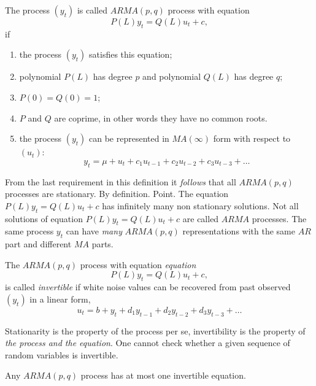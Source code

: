 \documentclass[12pt]{article} %
\begin{document}
\begin{definition}
    The process $(y_t)$ is called $ARMA(p, q)$ process with equation  
    \[
    P(L) y_t = Q(L) u_t + c,    
    \]
    if 
    \begin{enumerate}
        \item the process $(y_t)$ satisfies this equation;
        \item polynomial $P(L)$ has degree $p$ and polynomial $Q(L)$ has degree $q$;
        \item $P(0) = Q(0) = 1$;
        \item $P$ and $Q$ are coprime, in other words they have no common roots. 
        \item the process $(y_t)$ can be represented in $MA(\infty)$ form with respect to $(u_t)$:
        \[
            y_t = \mu + u_t + c_1 u_{t-1} + c_2 u_{t-2} + c_3 u_{t-3} + \ldots
        \]
    \end{enumerate}
\end{definition}


From the last requirement in this definition it \textit{follows} that all $ARMA(p,q)$ processes are 
stationary. By definition. Point. 
The equation $P(L) y_t = Q(L) u_t + c$ has infinitely many non stationary solutions. 
Not all solutions of equation $P(L) y_t = Q(L) u_t + c$ are called $ARMA$ processes. 
The same process $y_t$ can have \textit{many} $ARMA(p, q)$ representations with the same $AR$ part and 
different $MA$ parts. 



\begin{definition}
    The $ARMA(p, q)$ process with equation \textit{equation}
    \[
    P(L) y_t = Q(L) u_t + c,    
    \]
    is called \textit{invertible} if white noise values can be recovered from past observed $(y_t)$ in a linear form,
    \[
       u_t = b + y_t + d_1 y_{t-1} + d_2 y_{t-2} + d_3 y_{t-3} + \ldots      
    \]
\end{definition}


Stationarity is the property of the process per se, invertibility is the property of \textit{the process and the equation}. 
One cannot check whether a given sequence of random variables is invertible. 



\begin{theorem}
Any $ARMA(p, q)$ process has at most one invertible equation.
\end{theorem}
\end{document}
